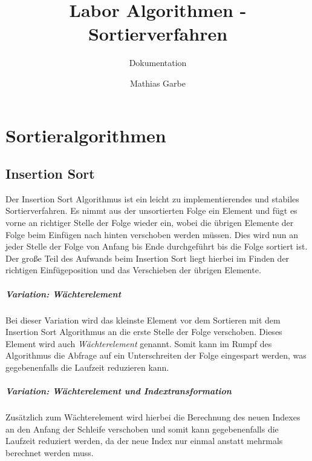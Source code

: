 \documentclass[12pt, a4paper, titlepage, hidelinks]{scrreprt}
\title{Labor Algorithmen - Sortierverfahren}
\subtitle{Dokumentation}
\author{Mathias Garbe}
\begin{document}
\maketitle

\tableofcontents
{}

\clearpage


\chapter{Sortieralgorithmen}

\section{Insertion Sort}

Der Insertion Sort Algorithmus ist ein leicht zu implementierendes und stabiles Sortierverfahren. Es nimmt aus der unsortierten Folge ein Element und fügt es vorne an richtiger Stelle der Folge wieder ein, wobei die übrigen Elemente der Folge beim Einfügen nach hinten verschoben werden müssen. Dies wird nun an jeder Stelle der Folge von Anfang bis Ende durchgeführt bis die Folge sortiert ist. Der große Teil des Aufwands beim Insertion Sort liegt hierbei im Finden der richtigen Einfügeposition und das Verschieben der übrigen Elemente.

\paragraph{Variation: Wächterelement} Bei dieser Variation wird das kleinste Element vor dem Sortieren mit dem Insertion Sort Algorithmus an die erste Stelle der Folge verschoben. Dieses Element wird auch \textit{Wächterelement} genannt. Somit kann im Rumpf des Algorithmus die Abfrage auf ein Unterschreiten der Folge eingespart werden, was gegebenenfalls die Laufzeit reduzieren kann.

\paragraph{Variation: Wächterelement und Indextransformation} Zusätzlich zum Wächterelement wird hierbei die Berechnung des neuen Indexes an den Anfang der Schleife verschoben und somit kann gegebenenfalls die Laufzeit reduziert werden, da der neue Index nur einmal anstatt mehrmals berechnet werden muss.
\end{document}
